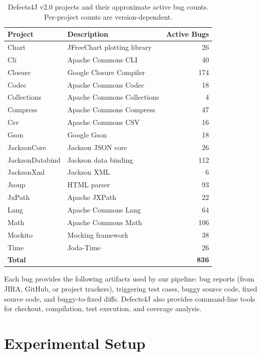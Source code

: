 \documentclass{iutbscthesis}
\begin{document}
\begin{table}[!htbp]
    \centering
    \begin{tabular}{l l r}
        \toprule
        \textbf{Project} & \textbf{Description} & \textbf{Active Bugs} \\
        \midrule
        Chart & JFreeChart plotting library & 26 \\
        Cli & Apache Commons CLI & 40 \\
        Closure & Google Closure Compiler & 174 \\
        Codec & Apache Commons Codec & 18 \\
        Collections & Apache Commons Collections & 4 \\
        Compress & Apache Commons Compress & 47 \\
        Csv & Apache Commons CSV & 16 \\
        Gson & Google Gson & 18 \\
        JacksonCore & Jackson JSON core & 26 \\
        JacksonDatabind & Jackson data binding & 112 \\
        JacksonXml & Jackson XML & 6 \\
        Jsoup & HTML parser & 93 \\
        JxPath & Apache JXPath & 22 \\
        Lang & Apache Commons Lang & 64 \\
        Math & Apache Commons Math & 106 \\
        Mockito & Mocking framework & 38 \\
        Time & Joda-Time & 26 \\
        \midrule
        \textbf{Total} & & \textbf{836} \\
        \bottomrule
    \end{tabular}
    \caption{Defects4J v2.0 projects and their approximate active bug counts. Per-project counts are version-dependent.}
    \label{tab:d4j_projects}
\end{table}

Each bug provides the following artifacts used by our pipeline: bug reports (from JIRA, GitHub, or project trackers), triggering test cases, buggy source code, fixed source code, and buggy-to-fixed diffs. Defects4J also provides command-line tools for checkout, compilation, test execution, and coverage analysis.

\section{Experimental Setup}
\end{document}
